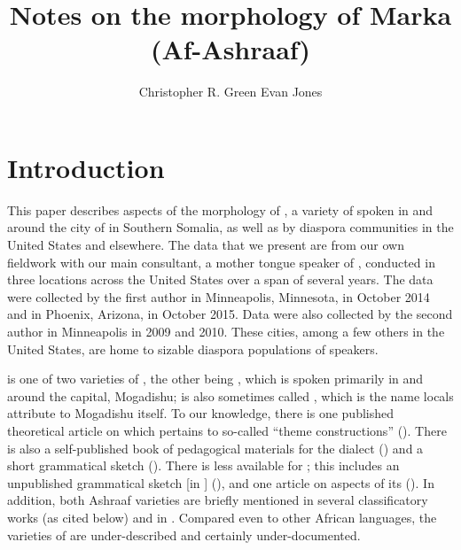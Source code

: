 \documentclass[output=paper,modfonts,nonflat,
hidelinks
]{langsci/langscibook}
\author{Christopher R. Green\affiliation{Syracuse University} 
\lastand Evan Jones\affiliation{University of Maryland}  
}
\title{Notes on the morphology of Marka (Af-Ashraaf)}
\begin{document}
\maketitle
\newcommand{\emphgj}[1]{\textit{#1}} %
\section{Introduction} 
 

 This paper describes aspects of the morphology of , a variety of  spoken in and around the city of  in Southern Somalia, as well as by diaspora communities in the United States and elsewhere. The data that we present are from our own fieldwork with our main consultant, a mother tongue speaker of , conducted in three locations across the United States over a span of several years. The data were collected by the first author in Minneapolis, Minnesota, in October 2014 and in Phoenix, Arizona, in October 2015. Data were also collected by the second author in Minneapolis in 2009 and 2010. These cities, among a few others in the United States, are home to sizable diaspora populations of  speakers. 
 
  is one of two varieties of , the other being , which is spoken primarily in and around the  capital, Mogadishu;  is also sometimes called , which is the name locals attribute to Mogadishu itself. To our knowledge, there is one published theoretical article on  which pertains to so-called ``{theme constructions}'' (\citealt{Ajello1984}). There is also a self-published book of pedagogical materials for the dialect (\citealt{Abo2007}) and a short grammatical sketch (\citealt{Moreno1953}). There is less available for ; this includes an unpublished grammatical sketch [in ] (\citealt{Lamberti1980}), and one article on aspects of its  (\citealt{Ajello1988}). In addition, both Ashraaf varieties are briefly mentioned in several classificatory works (as cited below) and in \citet{Banti2011}. Compared even to other African languages, the varieties of  are under-described and certainly under-documented.
 
\end{document}
